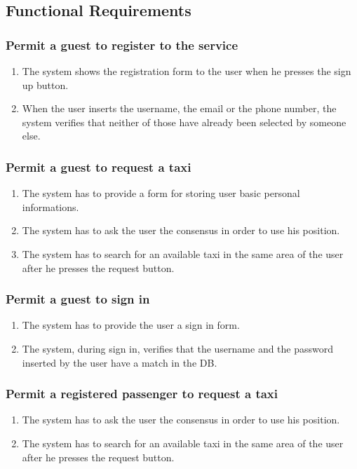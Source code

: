 \subsection{Functional Requirements}
\subsubsection{Permit a guest to register to the service}
\begin{enumerate}[label=\bfseries R\arabic*:]
	\item The system shows the registration form to the user when he presses the sign up button.
	\item When the user inserts the username, the email or the phone number, the system verifies that neither of those have already been selected by someone else.
\end{enumerate}
\subsubsection{Permit a guest to request a taxi}
\begin{enumerate}[label=\bfseries R\arabic*:]
	\item The system has to provide a form for storing user basic personal informations.
	\item The system has to ask the user the consensus in order to use his position.
	\item The system has to search for an available taxi in the same area of the user after he presses the request button.
\end{enumerate}
\subsubsection{Permit a guest to sign in}
\begin{enumerate}[label=\bfseries R\arabic*:]
	\item The system has to provide the user a sign in form.
	\item The system, during sign in, verifies that the username and the password inserted by the user have a match in the DB.
\end{enumerate}
\subsubsection{Permit a registered passenger to request a taxi}
\begin{enumerate}[label=\bfseries R\arabic*:]
	\item The system has to ask the user the consensus in order to use his position.
	\item The system has to search for an available taxi in the same area of the user after he presses the request button.
\end{enumerate}
